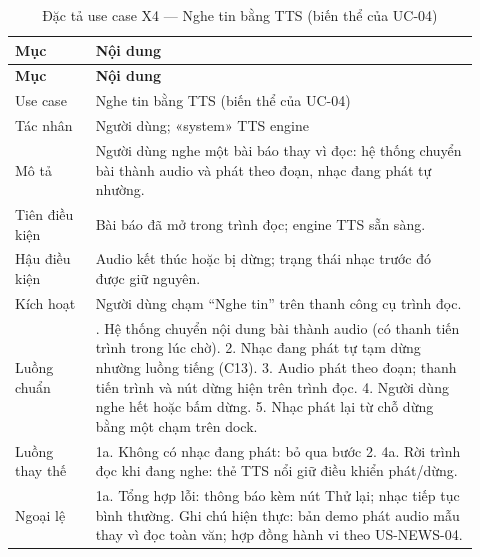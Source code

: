 \begingroup\small\renewcommand{\arraystretch}{1.15}\setlength{\tabcolsep}{3pt}
\begin{longtable}{>{\RaggedRight\arraybackslash}p{0.16\linewidth}>{\RaggedRight\arraybackslash}p{0.76\linewidth}}
\caption{Đặc tả use case X4 --- Nghe tin bằng TTS (biến thể của UC-04)}
\label{tab:spec-x4}\\
\toprule
\textbf{Mục} & \textbf{Nội dung} \\
\midrule
\endfirsthead
\toprule
\textbf{Mục} & \textbf{Nội dung} \\
\midrule
\endhead
\bottomrule
\endfoot
Use case & Nghe tin bằng TTS (biến thể của UC-04) \\
Tác nhân & Người dùng; «system» TTS engine \\
Mô tả & Người dùng nghe một bài báo thay vì đọc: hệ thống chuyển bài thành audio và phát theo đoạn, nhạc đang phát tự nhường. \\
Tiên điều kiện & Bài báo đã mở trong trình đọc; engine TTS sẵn sàng. \\
Hậu điều kiện & Audio kết thúc hoặc bị dừng; trạng thái nhạc trước đó được giữ nguyên. \\
Kích hoạt & Người dùng chạm “Nghe tin” trên thanh công cụ trình đọc. \\
Luồng chuẩn & 1. Hệ thống chuyển nội dung bài thành audio (có thanh tiến trình trong lúc chờ). 2. Nhạc đang phát tự tạm dừng nhường luồng tiếng (C13). 3. Audio phát theo đoạn; thanh tiến trình và nút dừng hiện trên trình đọc. 4. Người dùng nghe hết hoặc bấm dừng. 5. Nhạc phát lại từ chỗ dừng bằng một chạm trên dock. \\
Luồng thay thế & 1a. Không có nhạc đang phát: bỏ qua bước 2. 4a. Rời trình đọc khi đang nghe: thẻ TTS nổi giữ điều khiển phát/dừng. \\
Ngoại lệ & 1a. Tổng hợp lỗi: thông báo kèm nút Thử lại; nhạc tiếp tục bình thường. Ghi chú hiện thực: bản demo phát audio mẫu thay vì đọc toàn văn; hợp đồng hành vi theo US-NEWS-04. \\
\end{longtable}
\endgroup


